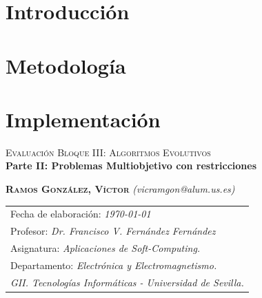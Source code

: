 \documentclass[11pt]{article}
\renewcommand{\{}{\left\lbrace}
\renewcommand{\}}{\right\rbrace}
\begin{document}
\section{Introducción}


\section{Metodología}


\section{Implementación}








\newpage

\hfill\break

\vspace{0.3cm}

{\Large{\textsc{Evaluación Bloque III: Algoritmos Evolutivos}}}\\

{\Large{\textbf{Parte II: Problemas Multiobjetivo con restricciones}}}


\vspace{0.2cm}

\textsc{\textbf{Ramos González, Víctor}} \textit{\footnotesize (vicramgon@alum.us.es)}\\

\vspace{0.1cm}

\begin{tabular}{>{\small}l}
Fecha de elaboración: \textit{\today}\\
Profesor: \textit{Dr. Francisco V. Fernández Fernández}\\
Asignatura: \textit{Aplicaciones de Soft-Computing.} \\
Departamento: \textit{ Electrónica y Electromagnetismo.} \\
\textit{GII. Tecnologías Informáticas - Universidad de Sevilla.}
\end{tabular}



\vspace{11pt}
\end{document}
